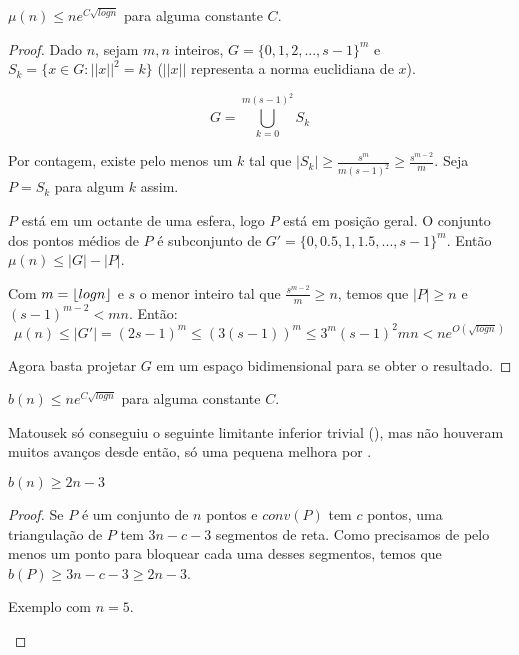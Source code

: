 \begin{teorema}
    $\mu(n)\leq ne^{C\sqrt{logn}}$ para alguma constante $C$. 
\end{teorema}
\begin{proof}
    Dado $n$, sejam $m,n$ inteiros, $G=\{0,1,2,...,s-1\}^m$ e $S_k=\{x\in G : ||x||^2 = k\}$ ($||x||$ representa a norma euclidiana de $x$).

    $$G=\bigcup_{k=0}^{m(s-1)^2}S_k$$

    Por contagem, existe pelo menos um $k$ tal que $|S_k|\geq \frac{s^m}{m(s-1)^2}\geq \frac{s^{m-2}}{m}$.
    Seja $P=S_k$ para algum $k$ assim.

    $P$ está em um octante de uma esfera, logo $P$ está em posição geral. O conjunto dos pontos médios de $P$ é subconjunto de $G'=\{0,0.5,1,1.5,...,s-1\}^m$. Então $\mu (n)\leq |G|-|P|$.

    Com $m=\lfloor logn\rfloor$ e $s$ o menor inteiro tal que $\frac{s^{m-2}}{m}\geq n$, temos que $|P|\geq n$ e $(s-1)^{m-2}<mn$. Então:
    $$\mu(n) \leq |G'| = (2s-1)^m\leq (3(s-1))^m \leq 3^m(s-1)^2mn<ne^{O(\sqrt{logn})}$$
    
    Agora basta projetar $G$ em um espaço bidimensional para se obter o resultado.
\end{proof}

\begin{corolario}
    $b(n)\leq ne^{C\sqrt{logn}}$ para alguma constante $C$. 
\end{corolario}

Matousek só conseguiu o seguinte limitante inferior trivial (\cite{blockers}), mas não houveram muitos avanços desde então, só uma pequena melhora por \cite{block}.

\begin{teorema}
    $b(n)\geq 2n-3$
\end{teorema}
\begin{proof}
    Se $P$ é um conjunto de $n$ pontos e $conv(P)$ tem $c$ pontos, uma triangulação de $P$ tem $3n-c-3$ segmentos de reta. Como precisamos de pelo menos um ponto para bloquear cada uma desses segmentos, temos que $b(P)\geq 3n-c-3\geq 2n-3$.
    \begin{center}
        
    Exemplo com $n=5$.
    \end{center}
\end{proof}


